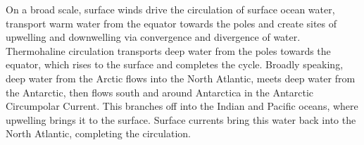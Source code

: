 \documentclass[10pt]{article}
\begin{document}
        On a broad scale, surface winds drive the circulation of surface ocean water, transport warm water from the equator towards the poles
        and create sites of upwelling and downwelling via convergence and divergence of water. Thermohaline circulation transports deep water
        from the poles towards the equator, which rises to the surface and completes the cycle. Broadly speaking, deep water
        from the Arctic flows into the North Atlantic, meets deep water from the Antarctic, then flows south and around Antarctica in the 
        Antarctic Circumpolar Current. This branches off into the Indian and Pacific oceans, where upwelling brings it to the surface.
        Surface currents bring this water back into the North Atlantic, completing the circulation.
\end{document}
